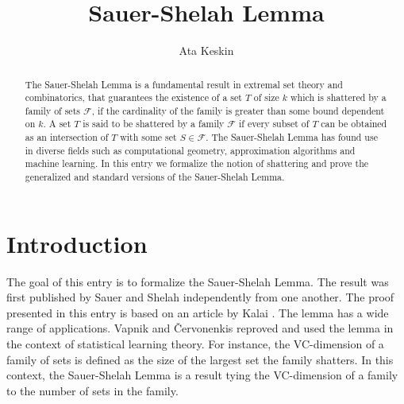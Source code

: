 \documentclass[11pt,a4paper]{article}
\begin{document}
\title{Sauer-Shelah Lemma}
\author{Ata Keskin}
\maketitle

\begin{abstract}
	The Sauer-Shelah Lemma is a fundamental result in extremal set theory and combinatorics, that guarantees the existence of a set $T$ of size $k$
	which is shattered by a family of sets $\mathcal{F}$, if the cardinality of the family is greater than some bound dependent on $k$. A set $T$ is
	said to be shattered by a family $\mathcal{F}$ if every subset of $T$ can be obtained as an intersection of $T$ with some set $S \in \mathcal{F}$.
	The Sauer-Shelah Lemma has found use in diverse fields such as computational geometry, approximation algorithms and machine learning. In this entry
	we formalize the notion of shattering and prove the generalized and standard versions of the Sauer-Shelah Lemma. 
\end{abstract}

\tableofcontents

\section{Introduction}

The goal of this entry is to formalize the Sauer-Shelah Lemma. The result was first published by Sauer \cite{SAUER1972145} and Shelah \cite{pjm/1102968432} independently from one another. The proof presented in this entry is based on an article by Kalai \cite{kalai_2008}. The lemma has a wide range of applications. Vapnik and \v{C}ervonenkis \cite{MR0288823} reproved and used the lemma in the context of statistical learning theory. For instance, the VC-dimension of a family of sets is defined as the size of the largest set the family shatters. In this context, the Sauer-Shelah Lemma is a result tying the VC-dimension of a family to the number of sets in the family. 






\end{document}
